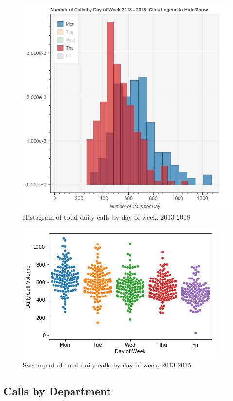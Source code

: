 \documentclass[11pt,twocolumn]{article}
\begin{document}
\begin{figure}[h]
	\includegraphics[scale=.2]{daily_calls.png}
	\caption{Histogram of total daily calls by day of week, 2013-2018}
\end{figure}

\begin{figure}[h]
	\includegraphics[scale=.6]{swarm.png}
	\caption{Swarmplot of total daily calls by day of week, 2013-2015}
\end{figure}

	\subsection{Calls by Department}
\end{document}
